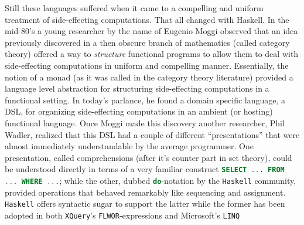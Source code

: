 Still these languages suffered when it came to a compelling and
uniform treatment of side-effecting computations. That all changed
with Haskell. In the mid-80's a young researcher by the name of
Eugenio Moggi observed that an idea previously discovered in a then
obscure branch of mathematics (called category theory) offered a way
to \emph{structure} functional programs to allow them to deal with
side-effecting computations in uniform and compelling
manner. Essentially, the notion of a monad (as it was called in the
category theory literature) provided a language level abstraction for
structuring side-effecting computations in a functional setting. In
today's parlance, he found a domain specific language, a DSL, for
organizing side-effecting computations in an ambient (or hosting)
functional language. Once Moggi made this discovery another
researcher, Phil Wadler, realized that this DSL had a couple of
different ``presentations'' that were almost immediately
understandable by the average programmer. One presentation, called
comprehensions (after it's counter part in set theory), could be
understood directly in terms of a very familiar construct
\lstinline[language=SQL]!SELECT ... FROM ... WHERE ...!; while the
other, dubbed \lstinline[language=Haskell]!do!-notation by the
\texttt{Haskell} community, provided operations that behaved
remarkably like sequencing and assignment. \texttt{Haskell} offers
syntactic sugar to support the latter while the former has been
adopted in both \texttt{XQuery}'s
\lstinline[language=XML]!FLWOR!-expressions and Microsoft's
\texttt{LINQ}
